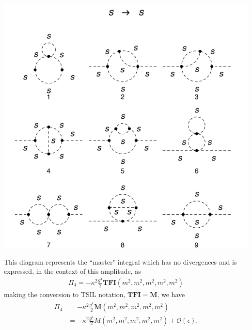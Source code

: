 \documentclass[11pt]{article}
\newcommand{\tsil}{\textsf{TSIL} }
\begin{document}
\noindent\begin{minipage}{0.3\textwidth}
\begin{center}
\includegraphics{2loop_4.pdf}
\end{center}
\end{minipage}
\noindent\begin{minipage}{0.7\textwidth}
This diagram represents the ``master" integral which has no divergences and is expressed, in the context of this amplitude, as
\begin{align}
\Pi_4 = -\kappa^2 \frac{g^4}{2} \mathbf{TFI}(m^2,m^2,m^2,m^2,m^2)
\end{align}
making the conversion to \tsil notation, $\mathbf{TFI}=\mathbf{M}$, we have
\begin{align}
\begin{split}
\Pi_4 &= - \kappa^2 \frac{g^4}{2} \mathbf{M}(m^2,m^2,m^2,m^2,m^2)\\&=- \kappa^2 \frac{g^4}{2} M(m^2,m^2,m^2,m^2,m^2)+\mathcal{O}(\epsilon).
\end{split}
\end{align}
\end{minipage}
\end{document}
